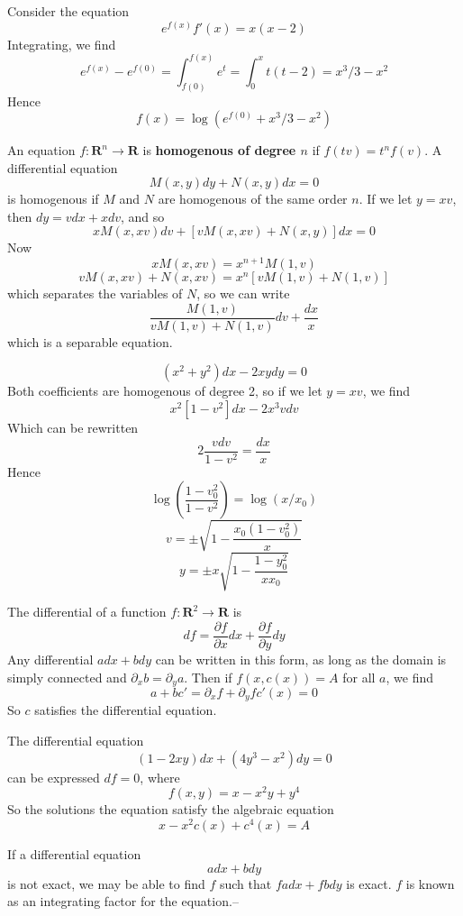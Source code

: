 \begin{example}
    Consider the equation
    \[ e^{f(x)} f'(x) = x (x-2) \]
    Integrating, we find
    \[ e^{f(x)} - e^{f(0)} = \int_{f(0)}^{f(x)} e^t = \int_0^x t(t-2) = x^3/3 - x^2 \]
    Hence
    \[ f(x) = \log(e^{f(0)} + x^3/3 - x^2) \]
\end{example}

An equation $f: \mathbf{R}^n \to \mathbf{R}$ is {\bf homogenous of degree $n$} if $f(tv) = t^n f(v)$. A differential equation
%
\[ M(x,y) dy + N(x,y) dx = 0 \]
%
is homogenous if $M$ and $N$ are homogenous of the same order $n$. If we let $y = xv$, then $dy = vdx + xdv$, and so
%
\[ x M(x,xv) dv + [v M(x,xv) + N(x,y)] dx = 0 \]
%
Now
%
\[ x M(x,xv) =  x^{n+1} M(1,v) \]
\[ v M(x,xv) + N(x,xv) = x^n[vM(1,v) + N(1,v)] \]
%
which separates the variables of $N$, so we can write
%
\[ \frac{M(1,v)}{vM(1,v) + N(1,v)} dv + \frac{dx}{x} \]
%
which is a separable equation.

\begin{example}
    \[ (x^2 + y^2) dx - 2xy dy = 0 \]
    Both coefficients are homogenous of degree 2, so if we let $y = xv$, we find
    \[ x^2[1 - v^2] dx - 2x^3v dv \]
    Which can be rewritten
    \[ 2 \frac{v dv}{1-v^2} = \frac{dx}{x} \]
    Hence
    \[ \log\left( \frac{1-v_0^2}{1 - v^2} \right) = \log(x/x_0) \]
    \[ v = \pm \sqrt{ 1 - \frac{x_0 (1 - v_0^2)}{x} } \]
    \[ y = \pm x \sqrt{ 1 - \frac{1 - y_0^2}{x x_0} } \]
\end{example}

The differential of a function $f: \mathbf{R}^2 \to \mathbf{R}$ is
%
\[ df = \frac{\partial f}{\partial x} dx + \frac{\partial f}{\partial y} dy \]
%
Any differential $a dx + b dy$ can be written in this form, as long as the domain is simply connected and $\partial_x b = \partial_y a$. Then if $f(x,c(x)) = A$ for all $a$, we find
%
\[ a + b c' = \partial_x f + \partial_y f c'(x) = 0 \]
%
So $c$ satisfies the differential equation.

\begin{example}
    The differential equation
    \[ (1 - 2xy) dx + (4y^3 - x^2) dy = 0 \]
    can be expressed $df = 0$, where
    \[ f(x,y) = x - x^2y + y^4 \]
    So the solutions the equation satisfy the algebraic equation
    \[ x - x^2 c(x) + c^4(x) = A \]
\end{example}

If a differential equation
%
\[ a dx + b dy \]
%
is not exact, we may be able to find $f$ such that $f a dx + f b dy$ is exact. $f$ is known as an integrating factor for the equation.--

